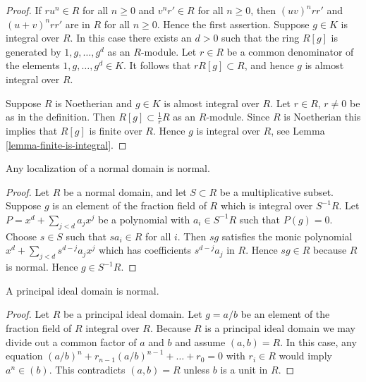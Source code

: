 \begin{proof}
If $ru^n \in R$ for all $n \geq 0$ and
$v^nr' \in R$ for all $n \geq 0$, then
$(uv)^nrr'$ and $(u + v)^nrr'$ are in $R$ for
all $n \geq 0$. Hence the first assertion.
Suppose $g \in K$ is integral over $R$.
In this case there exists an $d > 0$ such that
the ring $R[g]$ is generated by $1, g, \ldots, g^d$ as an $R$-module.
Let $r \in R$ be a common denominator of the elements
$1, g, \ldots, g^d \in K$. It follows that $rR[g] \subset R$,
and hence $g$ is almost integral over $R$.

\medskip\noindent
Suppose $R$ is Noetherian and $g \in K$ is almost integral over $R$.
Let $r \in R$, $r\not = 0$ be as in the definition.
Then $R[g] \subset \frac{1}{r}R$ as an $R$-module.
Since $R$ is Noetherian this implies that $R[g]$ is
finite over $R$. Hence $g$ is integral over $R$, see
Lemma \ref{lemma-finite-is-integral}.
\end{proof}

\begin{lemma}
\label{lemma-localize-normal-domain}
Any localization of a normal domain is normal.
\end{lemma}

\begin{proof}
Let $R$ be a normal domain, and let $S \subset R$ be
a multiplicative subset. Suppose $g$ is an element
of the fraction field of $R$ which is integral over $S^{-1}R$.
Let $P = x^d + \sum_{j < d} a_j x^j$ be a polynomial
with $a_i \in S^{-1}R$ such that $P(g) = 0$.
Choose $s \in S$ such that $sa_i \in R$ for all $i$.
Then $sg$ satisfies the monic polynomial
$x^d + \sum_{j < d} s^{d-j}a_j x^j$ which has coefficients
$s^{d-j}a_j$ in $R$. Hence $sg \in R$ because $R$ is normal.
Hence $g \in S^{-1}R$.
\end{proof}

\begin{lemma}
\label{lemma-PID-normal}
A principal ideal domain is normal.
\end{lemma}

\begin{proof}
Let $R$ be a principal ideal domain.
Let $g = a/b$ be an element of the fraction field
of $R$ integral over $R$. Because $R$ is a principal ideal domain
we may divide out a common factor of $a$ and $b$
and assume $(a, b) = R$. In this case, any equation
$(a/b)^n + r_{n-1} (a/b)^{n-1} + \ldots + r_0 = 0$
with $r_i \in R$ would imply $a^n \in (b)$. This
contradicts $(a, b) = R$ unless $b$ is a unit in $R$.
\end{proof}


